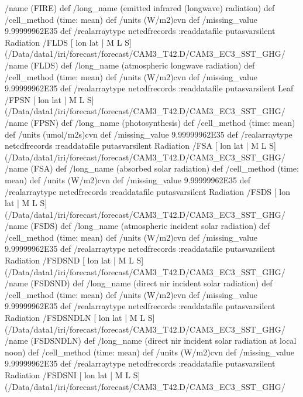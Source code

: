 \begin{ingrid}
{/name (FIRE) def
 /long_name (emitted infrared (longwave) radiation) def
 /cell_method (time: mean) def
 /units (W/m2)cvn def
 /missing_value 9.99999962E35 def
 /realarraytype netcdfrecords :readdatafile
}putasvarsilent
Radiation /FLDS{
[ lon lat | M L S] (/Data/data1/iri/forecast/forecast/CAM3_T42.D/CAM3_EC3_SST_GHG/%
/name (FLDS) def
 /long_name (atmospheric longwave radiation) def
 /cell_method (time: mean) def
 /units (W/m2)cvn def
 /missing_value 9.99999962E35 def
 /realarraytype netcdfrecords :readdatafile
}putasvarsilent
Leaf /FPSN{
[ lon lat | M L S] (/Data/data1/iri/forecast/forecast/CAM3_T42.D/CAM3_EC3_SST_GHG/%
/name (FPSN) def
 /long_name (photosynthesis) def
 /cell_method (time: mean) def
 /units (umol/m2s)cvn def
 /missing_value 9.99999962E35 def
 /realarraytype netcdfrecords :readdatafile
}putasvarsilent
Radiation /FSA{
[ lon lat | M L S] (/Data/data1/iri/forecast/forecast/CAM3_T42.D/CAM3_EC3_SST_GHG/%
/name (FSA) def
 /long_name (absorbed solar radiation) def
 /cell_method (time: mean) def
 /units (W/m2)cvn def
 /missing_value 9.99999962E35 def
 /realarraytype netcdfrecords :readdatafile
}putasvarsilent
Radiation /FSDS{
[ lon lat | M L S] (/Data/data1/iri/forecast/forecast/CAM3_T42.D/CAM3_EC3_SST_GHG/%
/name (FSDS) def
 /long_name (atmospheric incident solar radiation) def
 /cell_method (time: mean) def
 /units (W/m2)cvn def
 /missing_value 9.99999962E35 def
 /realarraytype netcdfrecords :readdatafile
}putasvarsilent
Radiation /FSDSND{
[ lon lat | M L S] (/Data/data1/iri/forecast/forecast/CAM3_T42.D/CAM3_EC3_SST_GHG/%
/name (FSDSND) def
 /long_name (direct nir incident solar radiation) def
 /cell_method (time: mean) def
 /units (W/m2)cvn def
 /missing_value 9.99999962E35 def
 /realarraytype netcdfrecords :readdatafile
}putasvarsilent
Radiation /FSDSNDLN{
[ lon lat | M L S] (/Data/data1/iri/forecast/forecast/CAM3_T42.D/CAM3_EC3_SST_GHG/%
/name (FSDSNDLN) def
 /long_name (direct nir incident solar radiation at local noon) def
 /cell_method (time: mean) def
 /units (W/m2)cvn def
 /missing_value 9.99999962E35 def
 /realarraytype netcdfrecords :readdatafile
}putasvarsilent
Radiation /FSDSNI{
[ lon lat | M L S] (/Data/data1/iri/forecast/forecast/CAM3_T42.D/CAM3_EC3_SST_GHG/%
}
\end{ingrid}
